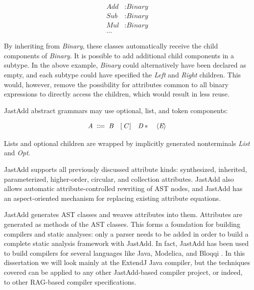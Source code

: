 \documentclass[10pt, twoside, openright]{book}
\begin{document}
\vbox{
\begin{align*}
\textit{Add} & : \textit{Binary} \\
\textit{Sub} & : \textit{Binary} \\
\textit{Mul} & : \textit{Binary} \\
\ldots &
\end{align*}
}

\noindent
By inheriting from \emph{Binary}, these classes automatically receive the child components
of \emph{Binary}. It is possible to add additional child components in a subtype.
In the above example, \emph{Binary} could alternatively have been declared as empty,
and each subtype could have specified the \emph{Left} and \emph{Right} children.
This would, however, remove the possibility for attributes common to all
binary expressions to directly access the children, which would result in less reuse.

JastAdd abstract grammars may use optional, list, and token components:

\begin{equation*}
\textit{A} \; \Coloneqq \; \textit{B} \quad [ \, \textit{C} \, ] \quad \textit{D}\ast \quad \langle\textit{E}\rangle  \\
\end{equation*}

\noindent
Lists and optional children are wrapped by implicitly generated nonterminals \emph{List} and \emph{Opt}.

JastAdd supports all previously discussed attribute kinds: synthesized, inherited, parameterized,
higher-order, circular, and collection attributes. JastAdd also allows automatic
attribute-controlled rewriting of AST nodes, and JastAdd has an aspect-oriented mechanism for
replacing existing attribute equations.

JastAdd generates AST classes and weaves attributes into them.
Attributes are generated as methods of the AST classes.
This forms a foundation for building compilers and static analyses: only a parser needs to
be added in order to build a complete static analysis framework with JastAdd.
In fact, JastAdd has been used to build compilers for several languages like Java, Modelica, and
Bloqqi \cite{jastaddj,DBLP:journals/cce/AkessonAGBT10,DBLP:conf/oopsla/ForsH16}.
In this dissertation we will look mainly at the ExtendJ Java compiler, but the techniques covered
can be applied to any other JastAdd-based compiler project, or indeed, to other RAG-based
compiler specifications.
\end{document}
